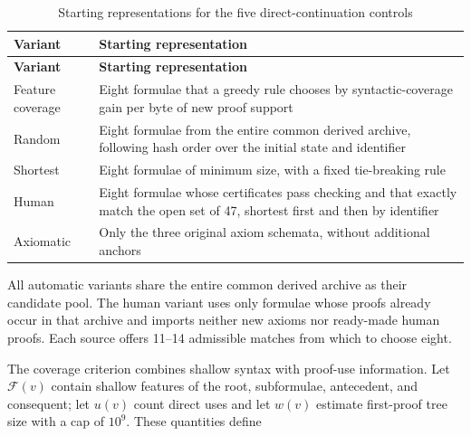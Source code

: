 \documentclass[pdflatex,sn-basic,Numbered]{sn-jnl}
\begin{document}
\begin{longtable}[]{@{}
  >{\raggedright\arraybackslash}p{}
  >{\raggedright\arraybackslash}p{}@{}}
\caption{Starting representations for the five direct-continuation controls}\label{tab:10}\tabularnewline
\toprule\noalign{}
\begin{minipage}[b]{\linewidth}\raggedright
\textbf{Variant}
\end{minipage} & \begin{minipage}[b]{\linewidth}\raggedright
\textbf{Starting representation}
\end{minipage} \\
\midrule\noalign{}
\endfirsthead
\toprule\noalign{}
\begin{minipage}[b]{\linewidth}\raggedright
\textbf{Variant}
\end{minipage} & \begin{minipage}[b]{\linewidth}\raggedright
\textbf{Starting representation}
\end{minipage} \\
\midrule\noalign{}
\endhead
\bottomrule\noalign{}
\endlastfoot
Feature coverage & Eight formulae that a greedy rule chooses by syntactic-coverage gain per byte of new proof support \\
Random & Eight formulae from the entire common derived archive, following hash order over the initial state and identifier \\
Shortest & Eight formulae of minimum size, with a fixed tie-breaking rule \\
Human & Eight formulae whose certificates pass checking and that exactly match the open set of 47, shortest first and then by identifier \\
Axiomatic & Only the three original axiom schemata, without additional anchors \\
\end{longtable}

\endgroup

All automatic variants share the entire common derived archive as their candidate pool. The human variant uses only formulae whose proofs already occur in that archive and imports neither new axioms nor ready-made human proofs. Each source offers 11--14 admissible matches from which to choose eight.

The coverage criterion combines shallow syntax with proof-use information. Let \(\mathcal{F}(v)\) contain shallow features of the root, subformulae, antecedent, and consequent; let \(u(v)\) count direct uses and let \(w(v)\) estimate first-proof tree size with a cap of \(10^{9}\). These quantities define
\end{document}
